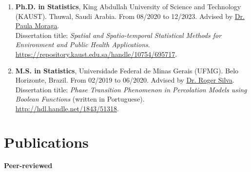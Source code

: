 \documentclass[10pt, ]{article}
\begin{document}
	\begin{enumerate}[noitemsep, topsep=0pt]
		\item \textbf{Ph.D. in Statistics}, King Abdullah University of Science and Technology (KAUST). Thuwal, Saudi Arabia. From 08/2020 to 12/2023. Advised by \href{https://www.paulamoraga.com/}{Dr. Paula Moraga}. %
		\\
		Dissertation title: \textit{Spatial and Spatio-temporal Statistical Methods for Environment and Public Health Applications}. \href{https://repository.kaust.edu.sa/handle/10754/695717}{\url{https://repository.kaust.edu.sa/handle/10754/695717}}.
		
		\item \textbf{M.S. in Statistics}, Universidade Federal de Minas Gerais (UFMG). Belo Horizonte, Brazil. From 02/2019 to 06/2020. Advised by \href{http://www.est.ufmg.br/~rogerwcs/}{Dr. Roger Silva}. %
		\\
		Dissertation title: \textit{Phase Transition Phenomenon in Percolation Models using Boolean Functions} (written in Portuguese). \href{http://hdl.handle.net/1843/51318}{\url{http://hdl.handle.net/1843/51318}}.
		
		
		
	\end{enumerate}
	
	\vspace{10pt}
	
	\vspace{-12pt}
	
	\section*{Publications} \vspace{-5pt}
	
	\textbf{Peer-reviewed} \vspace{-5pt}
	
\end{document}
